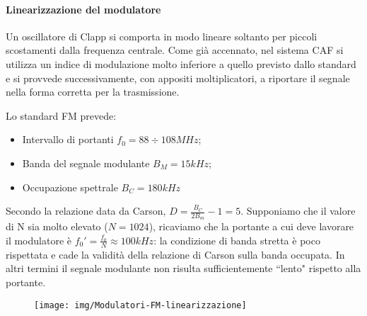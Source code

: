 \paragraph{Linearizzazione del modulatore}
Un oscillatore di Clapp si comporta in modo lineare soltanto per piccoli scostamenti dalla frequenza centrale. Come già accennato, nel sistema CAF si utilizza un indice di modulazione molto inferiore a quello previsto dallo standard e si provvede successivamente, con appositi moltiplicatori, a riportare il segnale nella forma corretta per la trasmissione.

Lo standard FM prevede:
\begin{itemize}
\item Intervallo di portanti $f_0 = 88\div108 MHz$;
\item Banda del segnale modulante $B_M = 15kHz$;
\item Occupazione spettrale $B_C = 180kHz$
\end{itemize}

Secondo la relazione data da Carson, $D = \frac{B_C}{2B_m} -1 = 5$. Supponiamo che il valore di N sia molto elevato ($N=1024$), ricaviamo che la portante a cui deve lavorare il modulatore è $f_0' = \frac{f_0}{N} \approx 100kHz$: la condizione di banda stretta è poco rispettata e cade la validità della relazione di Carson sulla banda occupata. In altri termini il segnale modulante non risulta sufficientemente ``lento" rispetto alla portante.

\begin{figure}[hb]
\centering
\texttt{[image: img/Modulatori-FM-linearizzazione]}
\caption{}
\label{fig:modulazionefmpiumeglio}
\end{figure}

